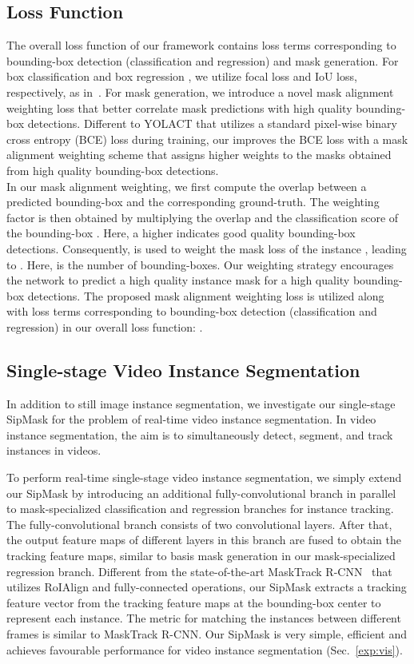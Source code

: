 \documentclass[runningheads]{llncs}
\begin{document}
\subsection{Loss Function}
\label{sec:loss}
The overall loss function of our framework contains loss terms corresponding to bounding-box detection (classification and regression) and mask generation. For box classification  and box regression , we utilize focal loss and IoU loss, respectively, as in~\cite{Tian_FCOS_ICCV_2019}. For mask generation, we introduce a novel mask alignment weighting loss  that better correlate mask predictions with high quality bounding-box detections. Different to YOLACT that utilizes a standard  pixel-wise binary cross entropy (BCE) loss during training, our  improves the BCE loss with a mask alignment weighting scheme that assigns higher weights to the masks   obtained from high quality bounding-box detections.\\
 In our mask alignment weighting, we first compute the  overlap  between a predicted bounding-box   and the corresponding ground-truth. The weighting factor   is then obtained by multiplying the overlap  and the classification score  of the bounding-box . Here, a higher   indicates good quality bounding-box detections. Consequently,  is used to weight the mask loss  of the instance , leading to  . Here,  is the number of bounding-boxes.   Our weighting strategy encourages the network to predict a high quality instance mask for a high quality bounding-box detections. The proposed mask alignment weighting loss  is utilized along with loss terms corresponding to bounding-box detection (classification and regression) in our overall loss function: . 

\subsection{Single-stage Video Instance Segmentation}
\label{sec:vis}
In addition to still image instance segmentation, we investigate our single-stage SipMask for the problem of real-time video instance segmentation. In video instance segmentation, the aim is to simultaneously detect, segment, and track instances in videos. 

To perform real-time single-stage video instance segmentation, we simply extend our SipMask by introducing an additional fully-convolutional branch in parallel to mask-specialized classification and regression branches for instance tracking. The fully-convolutional branch consists of two convolutional layers. After that, the output feature maps of different layers in this branch are fused to obtain the tracking feature maps, similar to basis mask generation in our mask-specialized regression branch. Different from the state-of-the-art MaskTrack R-CNN~\cite{Yang_VIS_ICCV_2019} that utilizes RoIAlign and fully-connected operations, our SipMask extracts a tracking feature vector from the tracking feature maps at the bounding-box center to represent each instance. The metric for matching the instances between different frames is similar to MaskTrack R-CNN. Our SipMask is very simple, efficient and achieves favourable performance for video instance segmentation (Sec.~\ref{exp:vis}).
\end{document}
